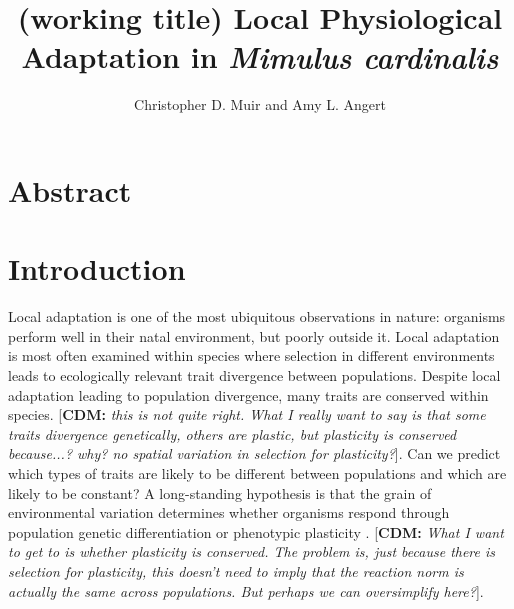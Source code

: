 \documentclass[11pt, oneside]{article}
\title{(working title) Local Physiological Adaptation in \textit{Mimulus cardinalis}}
\author{Christopher D. Muir and Amy L. Angert}
\newcommand{\cdm}[1]{{ \color{magenta} [{\bf{CDM:}} {\em#1}]}} %
\begin{document}
\maketitle
\listoffigures
\listoftables

\section*{Abstract}

\section*{Introduction}


Local adaptation is one of the most ubiquitous observations in nature: organisms perform well in their natal environment, but poorly outside it. Local adaptation is most often examined within species where selection in different environments leads to ecologically relevant trait divergence between populations. Despite local adaptation leading to population divergence, many traits are conserved within species. \cdm{this is not quite right. What I really want to say is that some traits divergence genetically, others are plastic, but plasticity is conserved because...? why? no spatial variation in selection for plasticity?}. Can we predict which types of traits are likely to be different between populations and which are likely to be constant? A long-standing hypothesis is that the grain of environmental variation determines whether organisms respond through population genetic differentiation or phenotypic plasticity \citep{}. \cdm{What I want to get to is whether plasticity is conserved. The problem is, just because there is selection for plasticity, this doesn't need to imply that the reaction norm is actually the same across populations. But perhaps we can oversimplify here?}. 
\end{document}
